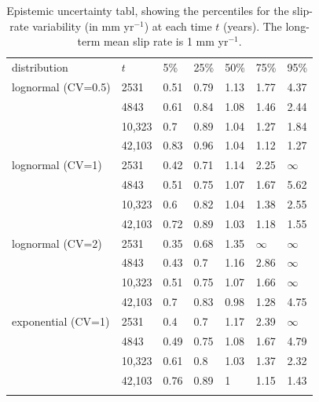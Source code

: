 \documentclass[se, manuscript]{copernicus}
\begin{document}
\begin{table}[t]
\begin{tabular}{lllllll}
\tophline
distribution  &  $t$     &     5\%  &   25\% &    50\% &   75\% &  95\% \\
\middlehline
lognormal (CV=0.5) & 2531  &  0.51 &  0.79 &  1.13 &  1.77 &  4.37 \\
      & 4843  &  0.61 &  0.84 &  1.08 &  1.46 &  2.44 \\
      & 10,323 &   0.7 &  0.89 &  1.04 &  1.27 &  1.84 \\
      & 42,103 &  0.83 &  0.96 &  1.04 &  1.12 &  1.27 \\
lognormal (CV=1) & 2531  &  0.42 &  0.71 &  1.14 &  2.25 &   $\infty$ \\
      & 4843  &  0.51 &  0.75 &  1.07 &  1.67 &  5.62 \\
      & 10,323 &   0.6 &  0.82 &  1.04 &  1.38 &  2.55 \\
      & 42,103 &  0.72 &  0.89 &  1.03 &  1.18 &  1.55 \\
lognormal (CV=2) & 2531  &  0.35 &  0.68 &  1.35 &   $\infty$ &   $\infty$ \\
      & 4843  &  0.43 &   0.7 &  1.16 &  2.86 &   $\infty$ \\
      & 10,323 &  0.51 &  0.75 &  1.07 &  1.66 &   $\infty$ \\
      & 42,103 &   0.7 &  0.83 &  0.98 &  1.28 &  4.75 \\
exponential (CV=1) & 2531  &   0.4 &   0.7 &  1.17 &  2.39 &   $\infty$ \\
      & 4843  &  0.49 &  0.75 &  1.08 &  1.67 &  4.79 \\
      & 10,323 &  0.61 &   0.8 &  1.03 &  1.37 &  2.32 \\
      & 42,103 &  0.76 &  0.89 &     1 &  1.15 &  1.43 \\
\bottomhline
\end{tabular}
  \caption{Epistemic uncertainty tabl, showing the percentiles for the 
    slip-rate variability (in mm yr$^{-1}$) at each time $t$ (years). The 
    long-term mean slip rate is 1 mm yr$^{-1}$. \label{ep_unc_table}}
\end{table}
\end{document}
